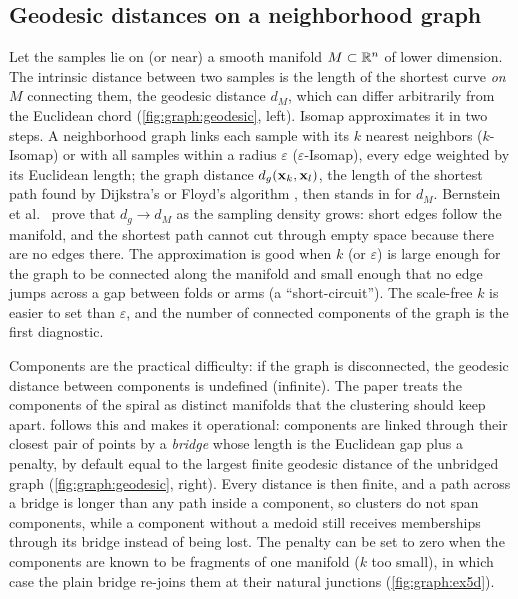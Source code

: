 \subsection{Geodesic distances on a neighborhood graph}\label{sec:graph:geodist}

Let the samples lie on (or near) a smooth manifold $M\subset\mathbb{R}^n$ of lower dimension. The intrinsic distance between two samples is the length of the shortest curve \emph{on $M$} connecting them, the geodesic distance $d_M$, which can differ arbitrarily from the Euclidean chord (\cref{fig:graph:geodesic}, left). Isomap \cite{tenenbaum:2000:isomap} approximates it in two steps. A neighborhood graph links each sample with its $k$ nearest neighbors ($k$-Isomap) or with all samples within a radius $\varepsilon$ ($\varepsilon$-Isomap), every edge weighted by its Euclidean length; the graph distance $d_g(\mathbf{x}_k,\mathbf{x}_l)$, the length of the shortest path found by Dijkstra's or Floyd's algorithm \cite{dijkstra:1959,floyd:1962}, then stands in for $d_M$. Bernstein et al.\ \cite{bernstein:2000:geodesic} prove that $d_g\to d_M$ as the sampling density grows: short edges follow the manifold, and the shortest path cannot cut through empty space because there are no edges there. The approximation is good when $k$ (or $\varepsilon$) is large enough for the graph to be connected along the manifold and small enough that no edge jumps across a gap between folds or arms (a ``short-circuit''). The scale-free $k$ is easier to set than $\varepsilon$, and the number of connected components of the graph is the first diagnostic.

Components are the practical difficulty: if the graph is disconnected, the geodesic distance between components is undefined (infinite). The paper treats the components of the spiral as distinct manifolds that the clustering should keep apart.  follows this and makes it operational: components are linked through their closest pair of points by a \emph{bridge} whose length is the Euclidean gap plus a penalty, by default equal to the largest finite geodesic distance of the unbridged graph (\cref{fig:graph:geodesic}, right). Every distance is then finite, and a path across a bridge is longer than any path inside a component, so clusters do not span components, while a component without a medoid still receives memberships through its bridge instead of being lost. The penalty can be set to zero when the components are known to be fragments of one manifold ($k$ too small), in which case the plain bridge re-joins them at their natural junctions (\cref{fig:graph:ex5d}).

